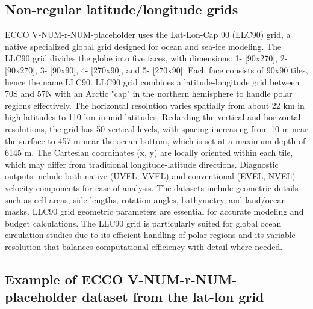 \subsection*{Non-regular latitude/longitude grids}
\par ECCO V-NUM-r-NUM-placeholder uses the Lat-Lon-Cap 90 (LLC90) grid, a native specialized global grid designed for ocean and sea-ice modeling. The LLC90 grid divides the globe into five faces, with dimensions: 1- [90x270], 2- [90x270], 3- [90x90], 4- [270x90], and 5- [270x90]. Each face consists of 90x90 tiles, hence the name LLC90. LLC90 grid combines a latitude-longitude grid between 70\textdegree S and 57\textdegree N with an Arctic "cap" in the northern hemisphere to handle polar regions effectively. The horizontal resolution varies spatially from about 22 km in high latitudes to 110 km in mid-latitudes. Redarding the vertical and horizontal resolutions, the grid has 50 vertical levels, with spacing increasing from 10 m near the surface to 457 m near the ocean bottom, which is set at a maximum depth of 6145 m. The Cartesian coordinates (x, y) are locally oriented within each tile, which may differ from traditional longitude-latitude directions. Diagnostic outputs include both native (UVEL, VVEL) and conventional (EVEL, NVEL) velocity components for ease of analysis. The datasets include geometric details such as cell areas, side lengths, rotation angles, bathymetry, and land/ocean masks. LLC90 grid geometric parameters are essential for accurate modeling and budget calculations. The LLC90 grid is particularly suited for global ocean circulation studies due to its efficient handling of polar regions and its variable resolution that balances computational efficiency with detail where needed.

\pagebreak
\subsection{Example of ECCO V-NUM-r-NUM-placeholder dataset from the lat-lon grid}

\pagebreak
